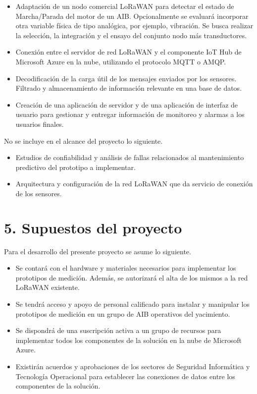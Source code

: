 \documentclass[
11pt, %
]{charter}
\begin{document}
\begin{itemize}
\item Adaptación de un nodo comercial LoRaWAN para detectar el estado de Marcha/Parada del motor de un AIB. Opcionalmente se evaluará incorporar otra variable física de tipo analógica, por ejemplo, vibración. Se busca realizar la selección, la integración y el ensayo del conjunto nodo más transductores.

\item Conexión entre el servidor de red LoRaWAN y el componente IoT Hub de Microsoft Azure en la nube, utilizando el protocolo MQTT o AMQP.

\item Decodificación de la carga útil de los mensajes enviados por los sensores. Filtrado y almacenamiento de información relevante en una base de datos.

\item Creación de una aplicación de servidor y de una aplicación de interfaz de usuario para gestionar y entregar información de monitoreo y alarmas a los usuarios finales.

\end{itemize}

No se incluye en el alcance del proyecto lo siguiente.

\begin{itemize}

\item Estudios de confiabilidad y análisis de fallas relacionados al mantenimiento predictivo del prototipo a implementar.

\item Arquitectura y configuración de la red LoRaWAN que da servicio de conexión de los sensores.

\end{itemize}



\section{5. Supuestos del proyecto}
\label{sec:supuestos}

Para el desarrollo del presente proyecto se asume lo siguiente.

\begin{itemize}
\item Se contará con el hardware y materiales necesarios para implementar los prototipos de medición. Además, se autorizará el alta de los mismos a la red LoRaWAN existente.
\item Se tendrá acceso y apoyo de personal calificado para instalar y manipular los prototipos de medición en un grupo de AIB operativos del yacimiento.
\item Se dispondrá de una suscripción activa a un grupo de recursos para implementar todos los componentes de la solución en la nube de Microsoft Azure.
\item Existirán acuerdos y aprobaciones de los sectores de Seguridad Informática y Tecnología Operacional para establecer las conexiones de datos entre los componentes de la solución.

\end{itemize}
\end{document}
